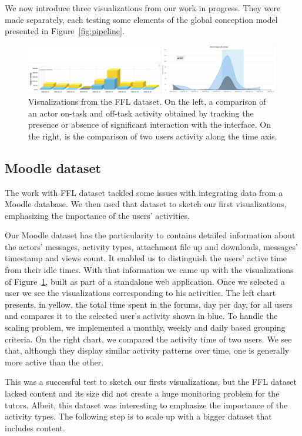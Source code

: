 \documentclass[a4paper,twoside]{article}
\begin{document}
We now introduce three visualizations from our work in progress.  They were made separately, each testing some elements of the global conception model presented in Figure~\ref{fig:pipeline}.


\begin{figure}[t]
  \includegraphics[width=\textwidth]{images/dynco.png}
  \small{
    \caption{\label{fig:dynco}
      Visualizations from the FFL dataset.  On the left, a comparison of an actor on-task and off-task activity obtained by tracking the presence or absence of significant interaction with the interface.  On the right, is the comparison of two users activity along the time axis.
    }}
\end{figure}

\subsection{Moodle dataset}
The work with FFL dataset tackled some issues with integrating data from a Moodle database.  We then used that dataset to sketch our first visualizations, emphasizing the importance of the users' activities.

Our Moodle dataset has the particularity to contains detailed information about the actors' messages, activity types,  attachment file up and downloads,  messages' timestamp and views count.  It enabled us to distinguish the users' active time from their idle times.  With that information we came up with the visualizations of Figure~\ref{fig:dynco}, built as part of a standalone web application.  Once we selected a user we see the visualizations corresponding to his activities.   The left chart presents, in yellow, the total time spent in the forums, day per day, for all users and compares it to the selected user's activity shown in blue.  To handle the scaling problem, we implemented a monthly, weekly and daily based grouping criteria.  On the right chart, we compared the activity time of two users.  We see that, although they display similar activity patterns over time, one is generally more active than the other.

This was a successful test to sketch our firsts visualizations, but the FFL dataset lacked content and its size did not create a huge monitoring problem for the tutors.  Albeit, this dataset was interesting to emphasize the importance of the activity types.  The following step is to scale up with a bigger dataset that includes content.
\end{document}
